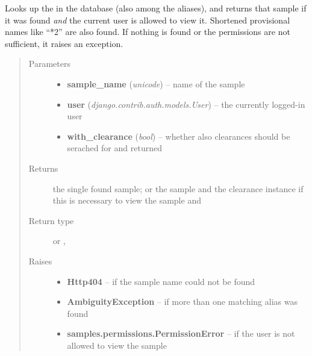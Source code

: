 \documentclass[a4paper,11pt,english]{sphinxmanual}
\begin{document}
\begin{fulllineitems}
\label{programming/utilities:samples.utils.views.lookup_sample}
Looks up the  in the database (also among the aliases),
and returns that sample if it was found \emph{and} the current user is allowed
to view it.  Shortened provisional names like “*2” are also found.  If
nothing is found or the permissions are not sufficient, it raises an
exception.
\begin{quote}\begin{description}
\item[{Parameters}] \leavevmode\begin{itemize}
\item {} 
\textbf{sample\_name} (\emph{unicode}) -- name of the sample

\item {} 
\textbf{user} (\emph{django.contrib.auth.models.User}) -- the currently logged-in user

\item {} 
\textbf{with\_clearance} (\emph{bool}) -- whether also clearances should be serached for and
returned

\end{itemize}

\item[{Returns}] \leavevmode
the single found sample; or the sample and the clearance instance if this
is necessary to view the sample and 

\item[{Return type}] \leavevmode
{} or ,

\item[{Raises}] \leavevmode\begin{itemize}
\item {} 
\textbf{Http404} -- if the sample name could not be found

\item {} 
\textbf{AmbiguityException} -- if more than one matching alias was found

\item {} 
\textbf{samples.permissions.PermissionError} -- if the user is not allowed to
view the sample

\end{itemize}

\end{description}\end{quote}

\end{fulllineitems}
\end{document}
